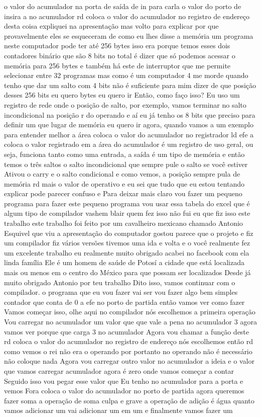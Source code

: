 \documentclass[oneside,11pt]{memoir} %
\begin{document}
o  valor do acumulador na porta de saída  de in para carla o valor do porto de  insira a no acumulador  rd coloca o valor do acumulador no  registro de endereço desta coisa  expliquei na apresentação mas volto  para explicar por que provavelmente  eles se esqueceram de como eu lhes disse a memória  um programa neste computador pode  ter até 256 bytes  isso era  porque temos esses dois contadores  binário que são 8 bits no total é  dizer que só podemos acessar o  memória para 256 bytes e também há este  de interruptor que me permite selecionar  entre 32 programas  mas como é um computador 4  me morde quando tenho que dar um salto  com 4 bits não é suficiente para mim dizer  de que posição desses 256 bits eu quero  bytes eu quero ir  Então, como faço isso?  Eu uso um registro de rede onde o  posição de salto, por exemplo, vamos terminar  no salto incondicional na posição  r do operando e aí eu já tenho  os 8 bits que preciso para definir um  que lugar de memória eu quero ir  agora, quando vamos a um exemplo para  entender melhor a área coloca o valor  do acumulador no registrador  ld efe a coloca o valor registrado em  a área do acumulador é um registro de  uso geral, ou seja, funciona tanto  como uma entrada, a saída é um  tipo de memória e então temos o  três saltos o salto incondicional que  sempre pule o salto se você estiver  Ativou o carry e o salto condicional  e como vemos, a posição sempre pula  de memória rd mais o valor de  operativo  e eu sei que tudo que eu estou tentando  explicar pode parecer confuso e  Para deixar mais claro vou fazer um  pequeno programa para fazer este pequeno  programa vou usar essa tabela do excel  que é algum tipo de compilador vashem  blair quem fez isso não fui eu que fiz isso  este trabalho este trabalho foi feito por um  cavalheiro mexicano chamado Antonio Esquivel  que viu a apresentação do  computador gostou parece que o projeto  e fiz um compilador fiz vários  versões tivemos uma ida e volta e o  você realmente fez um excelente trabalho  eu realmente muito obrigado  acabei no facebook com ela linda  família  Ele é um homem de saúde de Potosí a  cidade que está localizada mais ou menos em  o centro do México para que possam ser localizados  Desde já muito obrigado Antonio por  teu trabalho  Dito isso, vamos continuar com o compilador.  o programa que eu vou fazer vai ser  vou fazer algo bem simples  contador que conta de 0 a efe no  porto de partida  então vamos ver como fazer  Vamos começar isso, olhe aqui no  compilador nós escolhemos a primeira operação  Vou carregar no acumulador um valor que  que vale a pena  no acumulador 3 agora vamos ver porque  que carga 3 no acumulador  Agora vou chamar a função deste rd  coloca o valor do acumulador no  registro de endereço  nós escolhemos então rd  como vemos o rei não era o operando por  portanto no operando não é necessário  não coloque nada  Agora vou carregar outro valor no  acumulador  a ideia e o valor que vamos carregar  acumulador agora é zero onde  vamos começar a contar  Seguido isso vou pegar esse valor que  Eu tenho no acumulador para a porta e vemos  Fora  coloca o valor do acumulador no  porto de partida  agora queremos fazer soma  a operação de soma culpa e grave  a operação de adição é água quanto  vamos adicionar um vai adicionar um  em um  e finalmente vamos fazer um 
\end{document}
